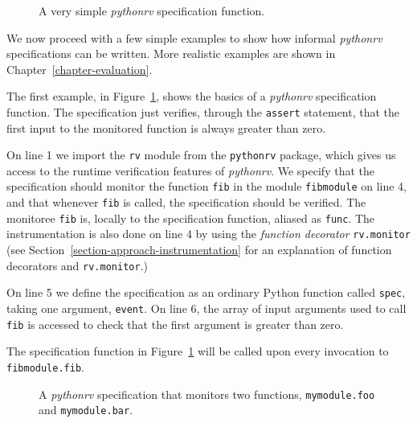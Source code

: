 \begin{figure}[h!]
	\begin{center}
	\begin{minipage}{0.5\textwidth}
	
	\end{minipage}
	\end{center}

  \caption{A very simple \textit{pythonrv} specification function.}
	\label{figure-syntax-example-1}
\end{figure}

We now proceed with a few simple examples to show how informal
\textit{pythonrv} specifications can be written. More realistic examples are
shown in Chapter~\ref{chapter-evaluation}.

The first example, in Figure~\ref{figure-syntax-example-1}, shows the basics of
a \textit{pythonrv} specification function. The specification just verifies,
through the \texttt{assert} statement, that the first input to the monitored
function is always greater than zero.

On line 1 we import the \texttt{rv} module from the \texttt{pythonrv} package,
which gives us access to the runtime verification features of
\textit{pythonrv}. We specify that the specification should monitor the
function \texttt{fib} in the module \texttt{fibmodule} on line 4, and that
whenever \texttt{fib} is called, the specification should be verified. The
monitoree \texttt{fib} is, locally to the specification function, aliased as
\texttt{func}. The instrumentation is also done on line 4 by using the
\textit{function decorator} \texttt{rv.monitor} (see
  Section~\ref{section-approach-instrumentation} for an explanation of function
decorators and \texttt{rv.monitor}.)

On line 5 we define the specification as an ordinary Python function called
\texttt{spec}, taking one argument, \texttt{event}. On line 6, the array of
input arguments used to call \texttt{fib} is accessed to check that the first
argument is greater than zero.

The specification function in Figure~\ref{figure-syntax-example-1} will be
called upon every invocation to \texttt{fibmodule.fib}.

\begin{figure}[h!]
	\begin{center}
	\begin{minipage}{0.7\textwidth}
	
	\end{minipage}
	\end{center}

  \caption{A \textit{pythonrv} specification that monitors two functions,
    \texttt{mymodule.foo} and \texttt{mymodule.bar}.}
	\label{figure-syntax-example-2}
\end{figure}

